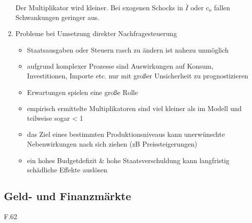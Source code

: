 \documentclass[11pt]{article}
\begin{document}
\begin{enumerate}
Der Multiplikator wird kleiner. Bei exogenen Schocks in \(\bar{I}\) oder c\(_{\text{o}}\) fallen Schwankungen geringer aus.

\item Probleme bei Umsetzung direkter Nachfragesteuerung
\label{sec:orga4e4269}

\begin{itemize}
\item Staatsausgaben oder Steuern rasch zu ändern ist nahezu unmöglich
\item aufgrund komplexer Prozesse sind Auswirkungen auf Konsum, Investitionen, Importe etc. nur mit großer Unsicherheit zu prognostizieren
\item Erwartungen spielen eine große Rolle
\item empirisch ermittelte Multiplikatoren sind viel kleiner als im Modell und teilweise sogar < 1
\item das Ziel eines bestimmten Produktionsniveaus kann unerwünschte Nebenwirkungen nach sich ziehen (zB Preissteigerungen)
\item ein hohes Budgetdefizit \& hohe Staatsverschuldung kann langfristig schädliche Effekte auslösen
\end{itemize}
\end{enumerate}

\subsection{Geld- und Finanzmärkte}
\label{sec:orgcdeca79}
F.62
\end{document}
